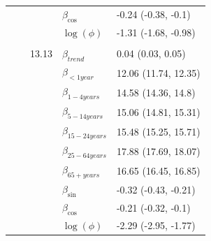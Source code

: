 \documentclass[a4paper,twoside,11pt]{report} %
\theoremstyle{definition}
\theoremstyle{definition}
\theoremstyle{definition}
\theoremstyle{definition}
\theoremstyle{remark}
\begin{document}
\begin{longtable}[t]{llrll}
 &  &  & $\beta_{\cos}$ & -0.24 (-0.38, -0.1)\\

\hspace{1em}\hspace{1em} &  &  & $\log(\phi)$ & -1.31 (-1.68, -0.98)\\
\cmidrule{2-5}
\addlinespace[0.3em]
\multicolumn{5}{l}{\begin{math}\log(\lambda_{it})=\beta(ageGroup_{i})+\beta_{trend} t + \beta_{\sin} \sin\Big(\frac{\pi\cdot \tau_{t}}{6}\Big) + \beta_{\cos} \cos\Big(\frac{\pi \cdot \tau_{t}}{6}\Big)+\log(n_{it})\end{math}}\\
\hspace{1em}\hspace{1em} &  & 13.13 & $\beta_{trend}$ & 0.04 (0.03, 0.05)\\

\hspace{1em}\hspace{1em} &  &  & $\beta_{<1 year}$ & 12.06 (11.74, 12.35)\\

\hspace{1em}\hspace{1em} &  &  & $\beta_{1-4 years}$ & 14.58 (14.36, 14.8)\\

\hspace{1em}\hspace{1em} &  &  & $\beta_{5-14 years}$ & 15.06 (14.81, 15.31)\\

\hspace{1em}\hspace{1em} &  &  & $\beta_{15-24 years}$ & 15.48 (15.25, 15.71)\\

\hspace{1em}\hspace{1em} &  &  & $\beta_{25-64 years}$ & 17.88 (17.69, 18.07)\\

\hspace{1em}\hspace{1em} &  &  & $\beta_{65+ years}$ & 16.65 (16.45, 16.85)\\

\hspace{1em}\hspace{1em} &  &  & $\beta_{\sin}$ & -0.32 (-0.43, -0.21)\\

\hspace{1em}\hspace{1em} &  &  & $\beta_{\cos}$ & -0.21 (-0.32, -0.1)\\

\hspace{1em}\hspace{1em} &  &  & $\log(\phi)$ & -2.29 (-2.95, -1.77)\\*
\end{longtable}
\end{document}
